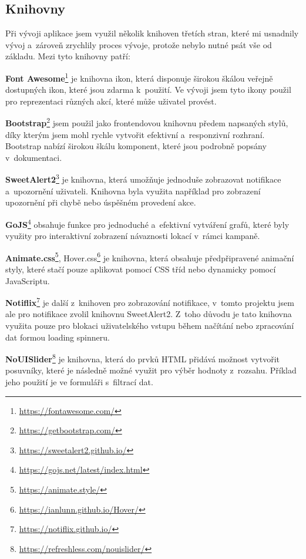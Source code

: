 \pagebreak


\subsection{Knihovny}
\label{subsec:implementation-technologies-libraries}
Při vývoji aplikace jsem využil několik knihoven třetích stran, které mi usnadnily vývoj a~zároveň zrychlily proces vývoje, protože nebylo nutné psát vše od základu. Mezi tyto knihovny patří:

\begin{description}
    \item \textbf{Font Awesome}\footnote{\href{https://fontawesome.com/}{https://fontawesome.com/}} je knihovna ikon, která disponuje širokou škálou veřejně dostupných ikon, které jsou zdarma k~použití. Ve vývoji jsem tyto ikony použil pro reprezentaci různých akcí, které může uživatel provést.
    \item \textbf{Bootstrap}\footnote{\href{https://getbootstrap.com/}{https://getbootstrap.com/}} jsem použil jako frontendovou knihovnu předem napsaných stylů, díky kterým jsem mohl rychle vytvořit efektivní a~responzivní rozhraní. Bootstrap nabízí širokou škálu komponent, které jsou podrobně popsány v~dokumentaci.
    \item \textbf{SweetAlert2}\footnote{\href{https://sweetalert2.github.io/}{https://sweetalert2.github.io/}} je knihovna, která umožňuje jednoduše zobrazovat notifikace a~upozornění uživateli. Knihovna byla využita například pro zobrazení upozornění při chybě nebo úspěšném provedení akce.
    \item \textbf{GoJS}\footnote{\href{https://gojs.net/latest/index.html}{https://gojs.net/latest/index.html}} obsahuje funkce pro jednoduché a~efektivní vytváření grafů, které byly využity pro interaktivní zobrazení návaznosti lokací v~rámci kampaně.
    \item \textbf{Animate.css}\footnote{\href{https://animate.style/}{https://animate.style/}}, Hover.css\footnote{\href{https://ianlunn.github.io/Hover/}{https://ianlunn.github.io/Hover/}} je knihovna, která obsahuje předpřipravené animační styly, které stačí pouze aplikovat pomocí CSS tříd nebo dynamicky pomocí JavaScriptu.
    \item \textbf{Notiflix}\footnote{\href{https://notiflix.github.io/}{https://notiflix.github.io/}} je další z~knihoven pro zobrazování notifikace, v~tomto projektu jsem ale pro notifikace zvolil knihovnu SweetAlert2. Z~toho důvodu je tato knihovna využita pouze pro blokaci uživatelského vstupu během načítání nebo zpracování dat formou loading spinneru.
    \item \textbf{NoUISlider}\footnote{\href{https://refreshless.com/nouislider/}{https://refreshless.com/nouislider/}} je knihovna, která do prvků HTML přidává možnost vytvořit posuvníky, které je následně možné využit pro výběr hodnoty z~rozsahu. Příklad jeho použití je ve formuláři s~filtrací dat.
\end{description}

